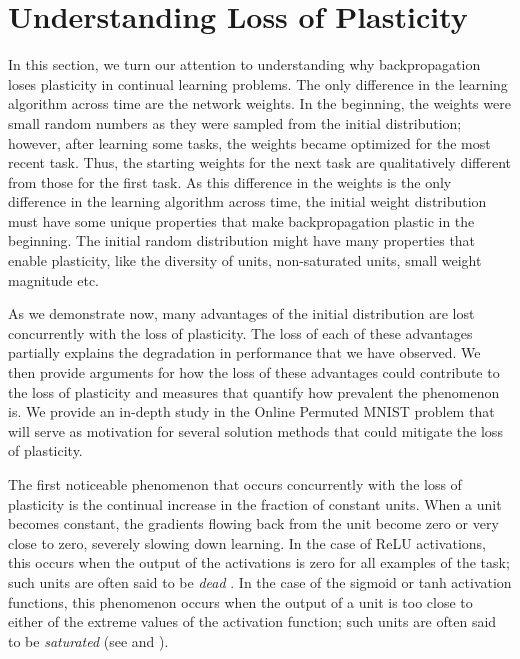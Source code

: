 \documentclass[review, number,3p]{elsarticle}
\begin{document}
\section{Understanding Loss of Plasticity}
\label{section:understanding_loss_of_plasticity}
In this section, we turn our attention to understanding why backpropagation loses plasticity in continual learning problems.
The only difference in the learning algorithm across time are the network weights.
In the beginning, the weights were small random numbers as they were sampled from the initial distribution; however, after learning some tasks, the weights became optimized for the most recent task.
Thus, the starting weights for the next task are qualitatively different from those for the first task. 
As this difference in the weights is the only difference in the learning algorithm across time, the initial weight distribution must have some unique properties that make backpropagation plastic in the beginning. 
The initial random distribution might have many properties that enable plasticity, like the diversity of units, non-saturated units, small weight magnitude etc.

As we demonstrate now, many advantages of the initial distribution are lost concurrently with the loss of plasticity.
The loss of each of these advantages partially explains the degradation in performance that we have observed.
We then provide arguments for how the loss of these advantages could contribute to the loss of plasticity and measures that quantify how prevalent the phenomenon is.
We provide an in-depth study in the Online Permuted MNIST problem that will serve as motivation for several solution methods that could mitigate the loss of plasticity. 

The first noticeable phenomenon that occurs concurrently with the loss of plasticity is the continual increase in the fraction of constant units.
When a unit becomes constant, the gradients flowing back from the unit become zero or very close to zero, severely slowing down learning.
In the case of ReLU activations, this occurs when the output of the activations is zero for all examples of the task; such units are often said to be \textit{dead} \cite{lu2019dying, shin2020trainability}.
In the case of the sigmoid or tanh activation functions, this phenomenon occurs when the output of a unit is too close to either of the extreme values of the activation function; such units are often said to be \textit{saturated} (see \cite{glorot2010understanding} and \cite[Chapter 19]{montavon2012neural}).
\end{document}
